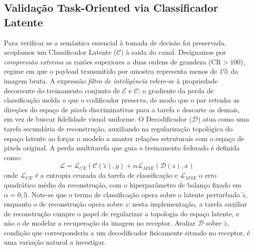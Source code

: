 \documentclass[conference,twocolumn]{IEEEtran}
\begin{document}
\subsection{Validação Task-Oriented via Classificador Latente}
Para verificar se a semântica essencial à tomada de decisão foi preservada, acoplamos um Classificador Latente ($\mathcal{C}$) à saída do canal. Designamos por \textit{compressão extrema} as razões superiores a duas ordens de grandeza ($\mathrm{CR} > 100$), regime em que o payload transmitido por amostra representa menos de $1\%$ da imagem bruta. A expressão \textit{filtro de inteligência} refere-se à propriedade decorrente do treinamento conjunto de $\mathcal{E}$ e $\mathcal{C}$: o gradiente da perda de classificação molda o que o codificador preserva, de modo que o par retenha as direções do espaço de \textit{pixels} discriminativas para a tarefa e descarte as demais, em vez de buscar fidelidade visual uniforme. O Decodificador ($\mathcal{D}$) atua como uma tarefa secundária de reconstrução, auxiliando na regularização topológica do espaço latente ao forçar o modelo a manter relações estruturais com o espaço de pixels original. A perda multitarefa que guia o treinamento federado é definida como:
\begin{equation}
    \mathcal{L} = \mathcal{L}_{CE}(\mathcal{C}(\tilde{z}), y) + \alpha \mathcal{L}_{MSE}(\mathcal{D}(z), x)
\end{equation}
onde $\mathcal{L}_{CE}$ é a entropia cruzada da tarefa de classificação e $\mathcal{L}_{MSE}$ o erro quadrático médio da reconstrução, com o hiperparâmetro de balanço fixado em $\alpha=0,5$. Note-se que o termo de classificação opera sobre o latente perturbado $\tilde{z}$, enquanto o de reconstrução opera sobre $z$: nesta implementação, a tarefa auxiliar de reconstrução cumpre o papel de regularizar a topologia do espaço latente, e não o de modelar a recuperação da imagem no receptor. Avaliar $\mathcal{D}$ sobre $\tilde{z}$, condição que corresponderia a um decodificador fisicamente situado no receptor, é uma variação natural a investigar.
\end{document}
